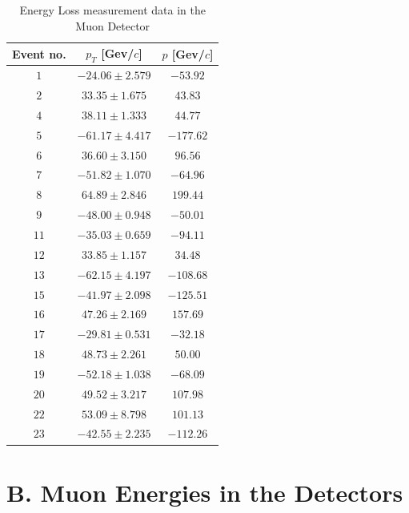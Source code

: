 \begin{table}[h]
		\centering
        \begin{tabular}{ccc}
            \toprule
             Event no. & $p_T$ [Gev/$c$] & $p$ [Gev/$c$] \\
				\midrule
				$1 $ & $-24.06 \pm 2.579$ & $-53.92$ \\
			\midrule
			$2 $ & $ 33.35 \pm 1.675$ & $ 43.83$ \\
			\midrule
			$4 $ & $ 38.11 \pm 1.333$ & $ 44.77$ \\
			\midrule
			$5 $ & $-61.17 \pm 4.417$ & $-177.62$ \\
			\midrule
			$6 $ & $ 36.60 \pm 3.150$ & $ 96.56$ \\
			\midrule
			$7 $ & $-51.82 \pm 1.070$ & $-64.96$ \\
			\midrule
			$8 $ & $ 64.89 \pm 2.846$ & $ 199.44$ \\
			\midrule
			$9 $ & $-48.00 \pm 0.948$ & $-50.01$ \\
			\midrule
			$11$ & $-35.03 \pm 0.659$ & $-94.11$ \\
			\midrule
			$12$ & $ 33.85 \pm 1.157$ & $ 34.48$ \\
			\midrule
			$13$ & $-62.15 \pm 4.197$ & $-108.68$ \\
			\midrule
			$15$ & $-41.97 \pm 2.098$ & $-125.51$ \\
			\midrule
			$16$ & $ 47.26 \pm 2.169$ & $ 157.69$ \\
			\midrule
			$17$ & $-29.81 \pm 0.531$ & $-32.18$ \\
			\midrule
			$18$ & $ 48.73 \pm 2.261$ & $ 50.00$ \\
			\midrule
			$19$ & $-52.18 \pm 1.038$ & $-68.09$ \\
			\midrule
			$20$ & $ 49.52 \pm 3.217$ & $ 107.98$ \\
			\midrule
			$22$ & $ 53.09 \pm 8.798$ & $ 101.13$ \\
			\midrule
			$23$ & $-42.55 \pm 2.235$ & $-112.26$ \\
			\bottomrule
        \end{tabular}
        \caption{Energy Loss measurement data in the Muon Detector}
        \label{tab:muondetector}
    \end{table}
\FloatBarrier

\section{B. Muon Energies in the Detectors}
\label{sec:sectionB}

